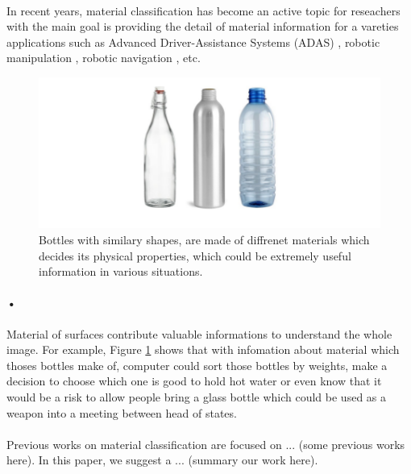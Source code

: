 \paragraph*{}
In recent years, material classification has become an active topic for reseachers with the main goal is providing the detail of material information for a vareties applications such as Advanced Driver-Assistance Systems (ADAS) \cite{r1}, robotic manipulation \cite{spong2006robot}, robotic navigation \cite{kim2013robot}, etc. 
\begin{figure}[h!]
\centering
\captionsetup{width=0.75\textwidth}
\includegraphics[width=0.7\linewidth]{images/bottles.png}
\caption[An example for where material could be valuable]{Bottles with similary shapes, are made of diffrenet materials which decides its physical properties, which could be extremely useful information in various situations.}
\label{fig:f1}
\end{figure}
\paragraph*{•}
Material of surfaces contribute valuable informations to understand the whole image. For example, Figure \ref{fig:f1} shows that with infomation about material which thoses bottles make of, computer could sort those bottles by weights, make a decision to choose which one is good to hold hot water or even know that it would be a risk to allow people bring a glass bottle which could be used as a weapon into a meeting between head of states.
\paragraph*{}
Previous works on material classification are focused on ... (some previous works here). In this paper, we suggest a ... (summary our work here). 